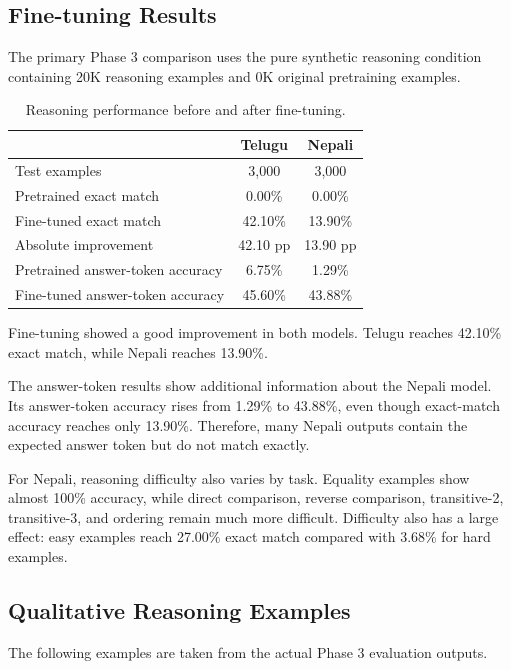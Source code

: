 \documentclass[10pt,a4paper]{article}
\begin{document}
\subsection{Fine-tuning Results}

The primary Phase 3 comparison uses the pure synthetic reasoning
condition containing 20K reasoning examples and 0K original
pretraining examples.

\begin{table}[H]
\centering
\small
\caption{Reasoning performance before and after fine-tuning.}
\begin{tabular}{lcc}
\toprule
 & \textbf{Telugu} & \textbf{Nepali}\\
\midrule
Test examples & 3,000 & 3,000\\
Pretrained exact match & 0.00\% & 0.00\%\\
Fine-tuned exact match & 42.10\% & 13.90\%\\
Absolute improvement & 42.10 pp & 13.90 pp\\
Pretrained answer-token accuracy & 6.75\% & 1.29\%\\
Fine-tuned answer-token accuracy & 45.60\% & 43.88\%\\
\bottomrule
\end{tabular}
\end{table}

Fine-tuning showed a good improvement in both models. Telugu
reaches 42.10\% exact match, while Nepali reaches 13.90\%.

The answer-token results show additional information about the Nepali
model. Its answer-token accuracy rises from 1.29\% to 43.88\%, even
though exact-match accuracy reaches only 13.90\%. Therefore, many
Nepali outputs contain the expected answer token but do not match
exactly.

For Nepali, reasoning difficulty also varies by task. Equality
examples show almost 100\% accuracy, while direct comparison, reverse
comparison, transitive-2, transitive-3, and ordering remain much more
difficult. Difficulty also has a large effect: easy examples reach
27.00\% exact match compared with 3.68\% for hard examples.

\subsection{Qualitative Reasoning Examples}

The following examples are taken from the actual Phase 3 evaluation
outputs.
\end{document}
